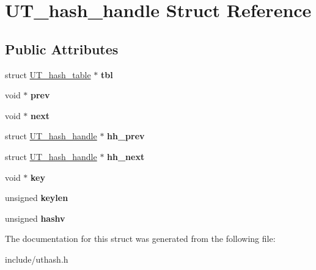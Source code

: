 \hypertarget{struct_u_t__hash__handle}{\section{U\+T\+\_\+hash\+\_\+handle Struct Reference}
\label{struct_u_t__hash__handle}
}
\subsection*{Public Attributes}
\begin{DoxyCompactItemize}
\item 
\hypertarget{struct_u_t__hash__handle_ad2035ee3b2aa55b22e352341372a5e73}{struct \hyperlink{struct_u_t__hash__table}{U\+T\+\_\+hash\+\_\+table} $\ast$ {\bfseries tbl}}\label{struct_u_t__hash__handle_ad2035ee3b2aa55b22e352341372a5e73}

\item 
\hypertarget{struct_u_t__hash__handle_abaf54a69367933df2d45575f48ca6a58}{void $\ast$ {\bfseries prev}}\label{struct_u_t__hash__handle_abaf54a69367933df2d45575f48ca6a58}

\item 
\hypertarget{struct_u_t__hash__handle_a93bc88ffe97f85ea0d9e0056b7118942}{void $\ast$ {\bfseries next}}\label{struct_u_t__hash__handle_a93bc88ffe97f85ea0d9e0056b7118942}

\item 
\hypertarget{struct_u_t__hash__handle_a3ec03e34d7975d5c1981c44b324619b2}{struct \hyperlink{struct_u_t__hash__handle}{U\+T\+\_\+hash\+\_\+handle} $\ast$ {\bfseries hh\+\_\+prev}}\label{struct_u_t__hash__handle_a3ec03e34d7975d5c1981c44b324619b2}

\item 
\hypertarget{struct_u_t__hash__handle_a4f6989385499ba6f594b0f0facd28325}{struct \hyperlink{struct_u_t__hash__handle}{U\+T\+\_\+hash\+\_\+handle} $\ast$ {\bfseries hh\+\_\+next}}\label{struct_u_t__hash__handle_a4f6989385499ba6f594b0f0facd28325}

\item 
\hypertarget{struct_u_t__hash__handle_a40690fc15aeaeba8f25385f05f84dd4d}{void $\ast$ {\bfseries key}}\label{struct_u_t__hash__handle_a40690fc15aeaeba8f25385f05f84dd4d}

\item 
\hypertarget{struct_u_t__hash__handle_af2abdc405972a6bbdee2ade2c0f346c4}{unsigned {\bfseries keylen}}\label{struct_u_t__hash__handle_af2abdc405972a6bbdee2ade2c0f346c4}

\item 
\hypertarget{struct_u_t__hash__handle_aae5e635fa110556e5007f627089f8323}{unsigned {\bfseries hashv}}\label{struct_u_t__hash__handle_aae5e635fa110556e5007f627089f8323}

\end{DoxyCompactItemize}


The documentation for this struct was generated from the following file\+:\begin{DoxyCompactItemize}
\item 
include/uthash.\+h\end{DoxyCompactItemize}
